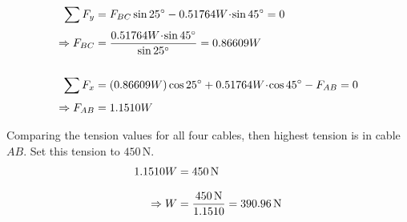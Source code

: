 \documentclass[10pt,oneside]{article}
\begin{document}
\begin{textblock*}{4in}
{	}
	\parm 
	\begin{align*}
		\sum F_y &= F_{BC}\sin 25^\circ - 0.51764W\!\cdot\!\sin 45^\circ =0 \\[0.25em]
		\Rightarrow F_{BC} &= \frac{0.51764W\!\cdot\!\sin 45^\circ}{\sin 25^\circ} = 0.86609W \\\\
		\sum F_x &= (0.86609W)\cos 25^\circ + 0.51764W\!\cdot\!\cos 45^\circ-F_{AB} =0 \\[0.25em]
		\Rightarrow F_{AB} &= 1.1510W
	\end{align*}
	\parb
	\raggedright
	Comparing the tension values for all four cables, then highest tension is in cable $AB$. Set this tension to $450\,\text{N}$.
	\begin{align*}
		1.1510W &= 450\,\text{N} \\[0.25cm]
		\Rightarrow W &= \frac{450\,\text{N}}{1.1510}= 390.96\,\text{N}
	\end{align*}
	
\end{textblock*}
\end{document}
